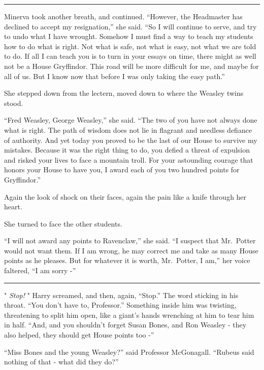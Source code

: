 \begin{center}\rule{3in}{0.4pt}\end{center}

Minerva took another breath, and continued. ``However, the Headmaster
has declined to accept my resignation,'' she said. ``So I will continue
to serve, and try to undo what I have wrought. Somehow I must find a way
to teach my students how to do what is right. Not what is safe, not what
is easy, not what we are told to do. If all I can teach you is to turn
in your essays on time, there might as well not be a House Gryffindor.
This road will be more difficult for me, and maybe for all of us. But I
know now that before I was only taking the easy path.''

She stepped down from the lectern, moved down to where the Weasley twins
stood.

``Fred Weasley, George Weasley,'' she said. ``The two of you have not
always done what is right. The path of wisdom does not lie in flagrant
and needless defiance of authority. And yet today you proved to be the
last of our House to survive my mistakes. Because it was the right thing
to do, you defied a threat of expulsion and risked your lives to face a
mountain troll. For your astounding courage that honors your House to
have you, I award each of you two hundred points for Gryffindor.''

Again the look of shock on their faces, again the pain like a knife
through her heart.

She turned to face the other students.

``I will not award any points to Ravenclaw,'' she said. ``I suspect that
Mr.~Potter would not want them. If I am wrong, he may correct me and
take as many House points as he pleases. But for whatever it is worth,
Mr.~Potter, I am,'' her voice faltered, ``I am sorry -''

\begin{center}\rule{3in}{0.4pt}\end{center}

" \emph{Stop!} " Harry screamed, and then, again, ``Stop.'' The word
sticking in his throat. ``You don't have to, Professor.'' Something
inside him was twisting, threatening to split him open, like a giant's
hands wrenching at him to tear him in half. ``And, and you shouldn't
forget Susan Bones, and Ron Weasley - they also helped, they should get
House points too -''

``Miss Bones and the young Weasley?'' said Professor McGonagall.
``Rubeus said nothing of that - what did they do?''

